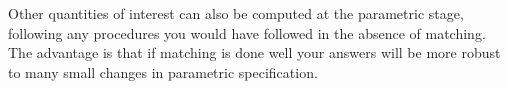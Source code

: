 Other quantities of interest can also be computed at the parametric
stage, following any procedures you would have followed in the absence
of matching.  The advantage is that if matching is done well your
answers will be more robust to many small changes in parametric
specification.


